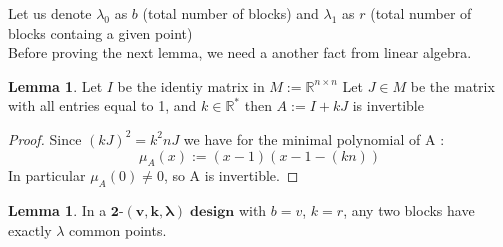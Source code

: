 \documentclass[12pt]{article}
\theoremstyle{definition}
\newtheorem{lemma}[theorem]{Lemma}
\numberwithin{equation}{theorem}
\numberwithin{figure}{theorem}
\newcommand{\tParamDesign}[4]{\ensuremath{\bm{#1\mbox{-}(#2,#3,#4)\; design}}}
\newcommand{\myMatrixRing}[2]{\ensuremath{#1^{#2\times#2}}}
\begin{document}
Let us denote $\lambda_0$ as $b$ (total number of blocks) and
$\lambda_1$ as $r$ (total number of blocks containg a given point)\\
Before proving the next lemma, we need a another fact from linear algebra.
\begin{lemma}\label{invertible}
Let $I$ be the identiy matrix in {$M := \myMatrixRing{\mathbb{R}}{n}$} Let $J \in M$ be the matrix with all entries equal to 1, and $k \in \mathbb{R}^*$ then $A := I + kJ$ is invertible
\end{lemma}
\begin{proof}
Since $(kJ)^2 = k^2 n J$ we have for the minimal polynomial of A :
\[
	\mu_A(x) := (x - 1)(x - 1 - (kn))
\]
In particular $\mu_A(0) \neq 0$, so A is invertible.
\end{proof}
\begin{lemma}\label{lambdaCommonPoints}
In a {\tParamDesign{2}{v}{k}{\lambda}} with $b = v$, $k = r$, any two blocks have exactly $\lambda$ common points.
\end{lemma}
\end{document}

